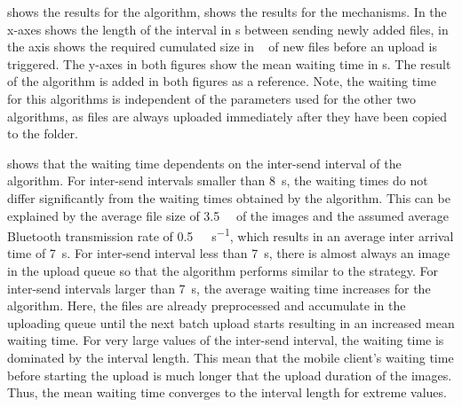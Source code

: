  shows the results for the \algointerval algorithm,  shows the results for the \algosize mechanisms. 
In  the x-axes shows the length of the interval in \si{\second} between sending newly added files, in  the axis shows the required cumulated size in \si{\mega\byte} of new files before an upload is triggered.
The y-axes in both figures show the mean waiting time \sojournTime in \si{\second}.
The result of the \algoimmediate algorithm is added in both figures as a reference.
Note, the waiting time for this algorithms is independent of the parameters used for the other two algorithms, as files are always uploaded immediately after they have been copied to the \dropbox folder.

 shows that the waiting time dependents on the inter-send interval of the \algointerval algorithm. 
For inter-send intervals smaller than \SI{8}{\second}, the waiting times do not differ significantly from the waiting times obtained by the \algoimmediate algorithm.
This can be explained by the average file size of \SI{3.5}{\mega\byte} of the images and the assumed average Bluetooth transmission rate of \SI{0.5}{\mega\bit\per\second}, which results in an average inter arrival time of \SI{7}{\second}.
For inter-send interval less than \SI{7}{\second}, there is almost always an image in the upload queue so that the algorithm performs similar to the \algoimmediate strategy. 
For inter-send intervals larger than \SI{7}{\second}, the average waiting time increases for the \algointerval algorithm.
Here, the files are already preprocessed and accumulate in the uploading queue until the next batch upload starts resulting in an increased mean waiting time.
For very large values of the inter-send interval, the waiting time is dominated by the interval length.
This mean that the mobile client's waiting time before starting the upload is much longer that the upload duration of the images.
Thus, the mean waiting time converges to the interval length for extreme values.

